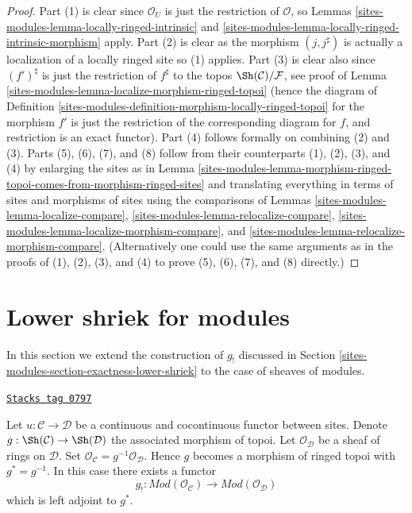 \begin{proof}
Part (1) is clear since $\mathcal{O}_U$ is just the
restriction of $\mathcal{O}$, so
Lemmas \ref{sites-modules-lemma-locally-ringed-intrinsic} and
\ref{sites-modules-lemma-locally-ringed-intrinsic-morphism}
apply. Part (2) is clear as the morphism $(j, j^\sharp)$
is actually a localization of a locally ringed site so (1) applies.
Part (3) is clear also since $(f')^\sharp$ is just the
restriction of $f^\sharp$ to the topos
$\Sh(\mathcal{C})/\mathcal{F}$, see proof of
Lemma \ref{sites-modules-lemma-localize-morphism-ringed-topoi}
(hence the diagram of
Definition \ref{sites-modules-definition-morphism-locally-ringed-topoi}
for the morphism $f'$ is just the restriction of the corresponding
diagram for $f$, and restriction is an exact functor).
Part (4) follows formally on combining (2) and (3).
Parts (5), (6), (7), and (8) follow from their counterparts
(1), (2), (3), and (4) by enlarging the sites as in
Lemma \ref{sites-modules-lemma-morphism-ringed-topoi-comes-from-morphism-ringed-sites}
and translating everything in terms of sites and morphisms of sites using
the comparisons of
Lemmas \ref{sites-modules-lemma-localize-compare},
\ref{sites-modules-lemma-relocalize-compare},
\ref{sites-modules-lemma-localize-morphism-compare}, and
\ref{sites-modules-lemma-relocalize-morphism-compare}.
(Alternatively one could use the same arguments as in the proofs
of (1), (2), (3), and (4) to prove (5), (6), (7), and (8) directly.)
\end{proof}

\section{Lower shriek for modules}
\label{sites-modules-section-lower-shriek-modules}
In this section we extend the construction of $g_!$ discussed
in Section \ref{sites-modules-section-exactness-lower-shriek} to the case of
sheaves of modules.

\begin{lemma}
\label{sites-modules-lemma-lower-shriek-modules}
\href{https://stacks.math.columbia.edu/tag/0797}{\texttt{Stacks tag 0797}}

Let $u : \mathcal{C} \to \mathcal{D}$ be a continuous and cocontinuous
functor between sites. Denote
$g : \Sh(\mathcal{C}) \to \Sh(\mathcal{D})$ the associated
morphism of topoi. Let $\mathcal{O}_\mathcal{D}$ be a sheaf of rings
on $\mathcal{D}$. Set
$\mathcal{O}_\mathcal{C} = g^{-1}\mathcal{O}_\mathcal{D}$.
Hence $g$ becomes a morphism of ringed topoi with $g^* = g^{-1}$.
In this case there exists a functor
$$
g_! :
\textit{Mod}(\mathcal{O}_\mathcal{C})
\longrightarrow
\textit{Mod}(\mathcal{O}_\mathcal{D})
$$
which is left adjoint to $g^*$.
\end{lemma}

